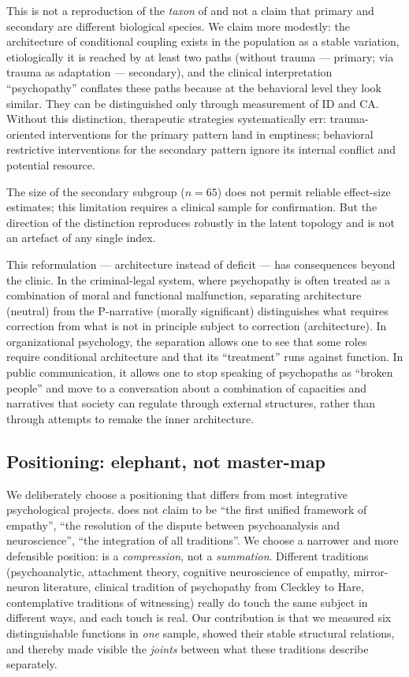 This is not a reproduction of the \emph{taxon} of \citet{hare2003} and not a claim that primary and secondary are different biological species. We claim more modestly: the architecture of conditional coupling exists in the population as a stable variation, etiologically it is reached by at least two paths (without trauma --- primary; via trauma as adaptation --- secondary), and the clinical interpretation ``psychopathy'' conflates these paths because at the behavioral level they look similar. They can be distinguished only through measurement of ID and CA. Without this distinction, therapeutic strategies systematically err: trauma-oriented interventions for the primary pattern land in emptiness; behavioral restrictive interventions for the secondary pattern ignore its internal conflict and potential resource.

The size of the secondary subgroup ($n = 65$) does not permit reliable effect-size estimates; this limitation requires a clinical sample for confirmation. But the direction of the distinction reproduces robustly in the latent topology and is not an artefact of any single index.

This reformulation --- architecture instead of deficit --- has consequences beyond the clinic. In the criminal-legal system, where psychopathy is often treated as a combination of moral and functional malfunction, separating architecture (neutral) from the P-narrative (morally significant) distinguishes what requires correction from what is not in principle subject to correction (architecture). In organizational psychology, the separation allows one to see that some roles require conditional architecture and that its ``treatment'' runs against function. In public communication, it allows one to stop speaking of psychopaths as ``broken people'' and move to a conversation about a combination of capacities and narratives that society can regulate through external structures, rather than through attempts to remake the inner architecture.

\subsection{Positioning: elephant, not master-map}
\label{subsec:positioning}

We deliberately choose a positioning that differs from most integrative psychological projects. \DEIC{} does not claim to be ``the first unified framework of empathy'', ``the resolution of the dispute between psychoanalysis and neuroscience'', ``the integration of all traditions''. We choose a narrower and more defensible position: \DEIC{} is a \emph{compression}, not a \emph{summation}. Different traditions (psychoanalytic, attachment theory, cognitive neuroscience of empathy, mirror-neuron literature, clinical tradition of psychopathy from Cleckley to Hare, contemplative traditions of witnessing) really do touch the same subject in different ways, and each touch is real. Our contribution is that we measured six distinguishable functions in \emph{one} sample, showed their stable structural relations, and thereby made visible the \emph{joints} between what these traditions describe separately.

